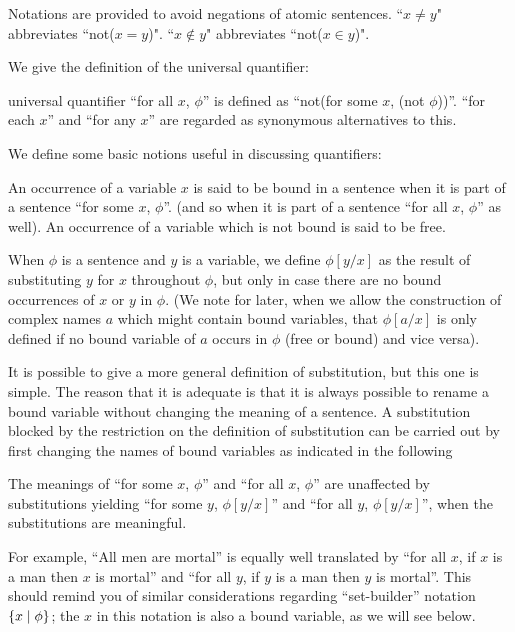 \begin{definition}

Notations are provided to avoid negations of atomic sentences.\linebreak
``$x \neq y$" abbreviates ``not($x=y$)".  ``$x \not\in y$" abbreviates ``not($x \in y$)".

\end{definition}

We give the definition of the universal quantifier:

\begin{Definition}{universal quantifier}
 ``for all $x$, $\phi$'' is defined as
 ``not(for some $x$, (not $\phi$))''.  ``for each $x$'' and ``for any
 $x$'' are regarded as synonymous alternatives to this.
\end{Definition}

We define some basic notions useful in discussing quantifiers:

\begin{definition}
 An occurrence of a variable $x$ is said to be {\upshape
 bound} in a sentence when it is part of a sentence ``for some $x$,
 $\phi$''.  (and so when it is part of a sentence ``for all $x$,
 $\phi$'' as well).  An occurrence of a variable which is not bound is
 said to be {\upshape free}.
\end{definition}

\begin{definition}
 When $\phi$ is a sentence and $y$ is a variable, we
 define $\phi[y/x]$ as the result of substituting $y$ for $x$
 throughout $\phi$, but only in case there are no bound occurrences of
 $x$ or $y$ in $\phi$.  (We note for later, when we allow the
 construction of complex names $a$ which might contain bound variables,
 that $\phi[a/x]$ is only defined if no bound variable of $a$ occurs in
 $\phi$ (free or bound) and {\upshape vice versa\/}).
\end{definition}

It is possible to give a more general definition of substitution, but
this one is simple.  The reason that it is adequate is that it is
always possible to rename a bound variable without changing the
meaning of a sentence.  A substitution blocked by the restriction on
the definition of substitution can be carried out by first changing
the names of bound variables as indicated in the following

\begin{fact}
 The meanings of ``for some $x$, $\phi$'' and ``for all
 $x$, $\phi$'' are unaffected by substitutions yielding ``for some $y$,
 $\phi[y/x]$'' and ``for all $y$, $\phi[y/x]$'', when the substitutions
 are meaningful.

 For example, ``All men are mortal'' is equally well translated by
 ``for all $x$, if $x$ is a man then $x$ is mortal'' and ``for all $y$,
 if $y$ is a man then $y$ is mortal''.  This should remind you of
 similar considerations regarding ``set-builder'' notation $\{x \mid
 \phi\}$; the $x$ in this notation is also a bound variable, as we will
 see below.
\end{fact}

